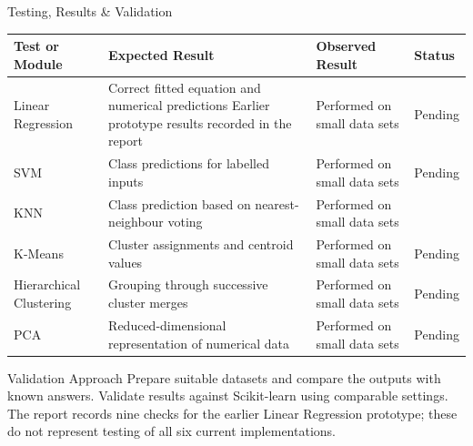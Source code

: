 \documentclass[aspectratio=169,11pt]{beamer}
\begin{document}
\begin{frame}[shrink=15]{Testing, Results \& Validation}
\scriptsize
\begin{center}
\renewcommand{\arraystretch}{1.3}
\begin{tabularx}{.96\textwidth}{@{}p{2.3cm}X X p{1.3cm}@{}}
\toprule
Test or Module & Expected Result & Observed Result & Status\\
\midrule
Linear Regression &	Correct fitted equation and numerical predictions	Earlier prototype results recorded in the report	&Performed on small data sets& Pending\\
SVM	&Class predictions for labelled inputs	&Performed on small data sets	&Pending\\
KNN	&Class prediction based on nearest-neighbour voting	&Performed on small data sets\\
K-Means	&Cluster assignments and centroid values	&Performed on small data sets	&Pending\\
Hierarchical Clustering	&Grouping through successive cluster merges&	Performed on small data sets&Pending\\
PCA	&Reduced-dimensional representation of numerical data	&Performed on small data sets	&Pending\\
\bottomrule
\end{tabularx}
\end{center}

\vspace{2mm}
\begin{block}{Validation Approach}
\footnotesize
Prepare suitable datasets and compare the outputs with known answers. Validate results against Scikit-learn using comparable settings. The report records nine checks for the earlier Linear Regression prototype; these do not represent testing of all six current implementations.
\end{block}
\end{frame}
\end{document}
